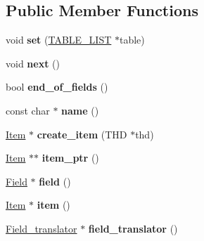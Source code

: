 \subsection*{Public Member Functions}
\begin{DoxyCompactItemize}
\item 
\mbox{\label{classField__iterator__view_aa6db87bf8424fed00b339551b906ce3d}} 
void {\bfseries set} (\mbox{\hyperlink{structTABLE__LIST}{T\+A\+B\+L\+E\+\_\+\+L\+I\+ST}} $\ast$table)
\item 
\mbox{\label{classField__iterator__view_a37a3599f440d64781e0a7c3360f11338}} 
void {\bfseries next} ()
\item 
\mbox{\label{classField__iterator__view_ac7f9f6eb21340ab09e5c52c4f6bb5337}} 
bool {\bfseries end\+\_\+of\+\_\+fields} ()
\item 
\mbox{\label{classField__iterator__view_a2625df347d72de4ead4606cb2e96f3c8}} 
const char $\ast$ {\bfseries name} ()
\item 
\mbox{\label{classField__iterator__view_a67a2ab19b6e1610a656e8a48df4592f5}} 
\mbox{\hyperlink{classItem}{Item}} $\ast$ {\bfseries create\+\_\+item} (T\+HD $\ast$thd)
\item 
\mbox{\label{classField__iterator__view_acc2a4da713683108103f4f5dab7082c2}} 
\mbox{\hyperlink{classItem}{Item}} $\ast$$\ast$ {\bfseries item\+\_\+ptr} ()
\item 
\mbox{\label{classField__iterator__view_ada56674b0894a5996fa1aa79f6f30645}} 
\mbox{\hyperlink{classField}{Field}} $\ast$ {\bfseries field} ()
\item 
\mbox{\label{classField__iterator__view_a159190d497ec97ebe851774c83cb49b0}} 
\mbox{\hyperlink{classItem}{Item}} $\ast$ {\bfseries item} ()
\item 
\mbox{\label{classField__iterator__view_a52b1cde93e4f4664d89c54d0bc3221b2}} 
\mbox{\hyperlink{structField__translator}{Field\+\_\+translator}} $\ast$ {\bfseries field\+\_\+translator} ()
\end{DoxyCompactItemize}
